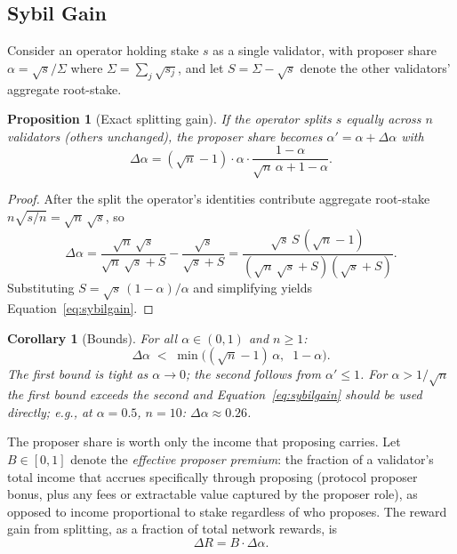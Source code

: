 \documentclass[11pt,a4paper]{article}
\newtheorem{proposition}{Proposition}
\newtheorem{corollary}{Corollary}
\begin{document}
\subsection{Sybil Gain}
\label{sec:sybil}

Consider an operator holding stake $s$ as a single validator, with proposer share $\alpha = \sqrt{s}/\Sigma$ where $\Sigma = \sum_j \sqrt{s_j}$, and let $S = \Sigma - \sqrt{s}$ denote the other validators' aggregate root-stake.

\begin{proposition}[Exact splitting gain]
\label{prop:sybil}
If the operator splits $s$ equally across $n$ validators (others unchanged), the proposer share becomes $\alpha' = \alpha + \Delta\alpha$ with
\begin{equation}
\label{eq:sybilgain}
\Delta\alpha = (\sqrt{n} - 1) \cdot \alpha \cdot \frac{1 - \alpha}{\sqrt{n}\,\alpha + 1 - \alpha}.
\end{equation}
\end{proposition}

\begin{proof}
After the split the operator's identities contribute aggregate root-stake $n\sqrt{s/n} = \sqrt{n}\,\sqrt{s}$, so
\[
\Delta\alpha = \frac{\sqrt{n}\,\sqrt{s}}{\sqrt{n}\,\sqrt{s} + S} - \frac{\sqrt{s}}{\sqrt{s} + S}
= \frac{\sqrt{s}\, S\,(\sqrt{n}-1)}{(\sqrt{n}\,\sqrt{s} + S)(\sqrt{s} + S)}.
\]
Substituting $S = \sqrt{s}\,(1-\alpha)/\alpha$ and simplifying yields Equation~\eqref{eq:sybilgain}.
\end{proof}

\begin{corollary}[Bounds]
\label{cor:bounds}
For all $\alpha \in (0,1)$ and $n \ge 1$:
\[
\Delta\alpha \;<\; \min\bigl( (\sqrt{n}-1)\,\alpha, \;\; 1 - \alpha \bigr).
\]
The first bound is tight as $\alpha \to 0$; the second follows from $\alpha' \le 1$. For $\alpha > 1/\sqrt{n}$ the first bound exceeds the second and Equation~\eqref{eq:sybilgain} should be used directly; e.g., at $\alpha = 0.5$, $n = 10$: $\Delta\alpha \approx 0.26$.
\end{corollary}

The proposer share is worth only the income that proposing carries. Let $B \in [0,1]$ denote the \emph{effective proposer premium}: the fraction of a validator's total income that accrues specifically through proposing (protocol proposer bonus, plus any fees or extractable value captured by the proposer role), as opposed to income proportional to stake regardless of who proposes. The reward gain from splitting, as a fraction of total network rewards, is
\begin{equation}
\label{eq:deltaR}
\Delta R = B \cdot \Delta\alpha .
\end{equation}
\end{document}
